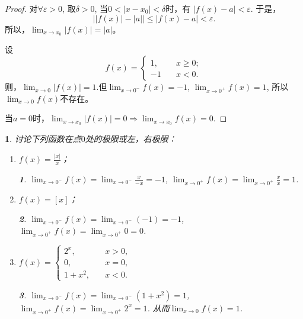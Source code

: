 \documentclass[utf8]{book}
\newtheorem{example}{}[section]             %
\newtheorem{solution}{}
\begin{document}
\begin{proof}对$\forall \varepsilon > 0$, 取$\delta > 0$, 当$0 < |x-x_0| < \delta$时，有 $|f(x)-a| < \varepsilon$. 于是，
$$\displaystyle\left||f(x)| - |a|\right| \leq |f(x) - a|<\varepsilon.$$
所以，$\displaystyle\lim_{x\to x_0}|f(x)|=|a|$。

设
\begin{equation*}
f(x) = 
\begin{cases}
1, \quad&x\geq 0;\\
-1 \quad&x<0.
\end{cases}
\end{equation*}
则，$\displaystyle\lim_{x\to 0}|f(x)|=1$.但$\displaystyle\lim_{x\to 0^{-}}f(x)=-1$, $\displaystyle\lim_{x\to 0^{+}}f(x)=1$, 所以$\displaystyle\lim_{x\to 0}f(x)$不存在。

当$a=0$时，$\displaystyle\lim_{x\to x_0}|f(x)|=0\Rightarrow\displaystyle\lim_{x\to x_0}f(x)=0$.
\end{proof}
\begin{example}
讨论下列函数在点$0$处的极限或左，右极限：
\renewcommand\labelenumi{\normalfont(\theenumi)}
\begin{enumerate}
\item $f(x)=\frac{|x|}{x}$；
\begin{solution}
$\displaystyle\lim_{x\to 0^{-}}f(x)=\displaystyle\lim_{x\to 0^{-}}\frac{x}{-x} = -1$, $\displaystyle\lim_{x\to 0^{+}}f(x)=\displaystyle\lim_{x\to 0^{+}}\frac{x}{x} = 1$.
\end{solution}
\item $f(x)=[x]$；
\begin{solution}
$\displaystyle\lim_{x\to 0^{-}}f(x)=\displaystyle\lim_{x\to 0^{-}}(-1) = -1$, $\displaystyle\lim_{x\to 0^{+}}f(x)=\displaystyle\lim_{x\to 0^{+}}0= 0$.
\end{solution}
\item $f(x)=
\begin{cases}
2^x, \quad&x>0,\\
0, \quad&x=0,\\
1+x^2,\quad&x<0.
\end{cases}
$
\begin{solution}
$\displaystyle\lim_{x\to 0^{-}}f(x)=\displaystyle\lim_{x\to 0^{-}}(1+x^2) = 1$, $\displaystyle\lim_{x\to 0^{+}}f(x)=\displaystyle\lim_{x\to 0^{+}}2^x= 1$. 
从而$\displaystyle\lim_{x\to 0}f(x) = 1$.
\end{solution}
\end{enumerate}
\end{example}
\end{document}
